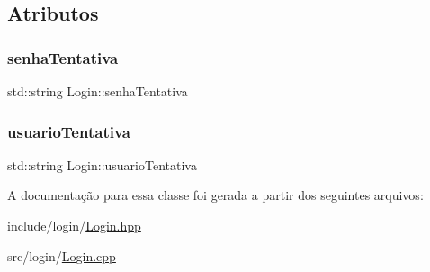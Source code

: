 \subsection{Atributos}
\mbox{\label{class_login_aa6bfcf95af6481918200dc7734137b49}} 
\subsubsection{\texorpdfstring{senhaTentativa}{senhaTentativa}}
{\footnotesize\ttfamily std\+::string Login\+::senha\+Tentativa}

\mbox{\label{class_login_ac137611f79410d16529d333fe503c8ec}} 
\subsubsection{\texorpdfstring{usuarioTentativa}{usuarioTentativa}}
{\footnotesize\ttfamily std\+::string Login\+::usuario\+Tentativa}



A documentação para essa classe foi gerada a partir dos seguintes arquivos\+:\begin{DoxyCompactItemize}
\item 
include/login/\mbox{\hyperlink{_login_8hpp}{Login.\+hpp}}\item 
src/login/\mbox{\hyperlink{_login_8cpp}{Login.\+cpp}}\end{DoxyCompactItemize}
